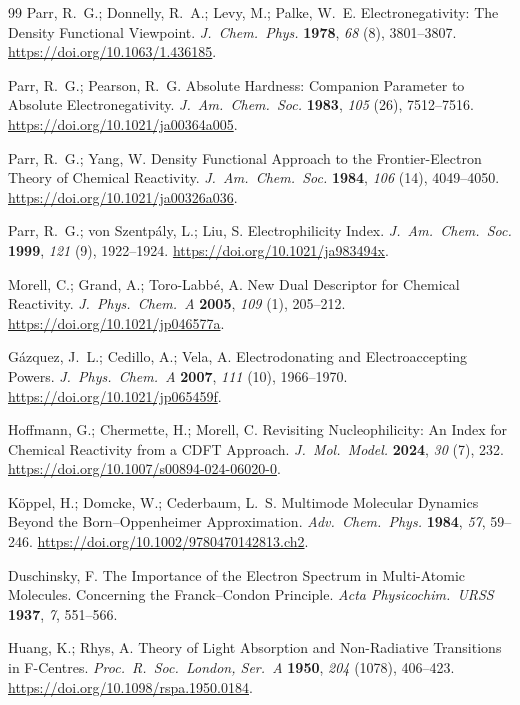 \begin{thebibliography}{99}
Parr, R.~G.; Donnelly, R.~A.; Levy, M.; Palke, W.~E. Electronegativity: The Density Functional Viewpoint. \emph{J.~Chem.~Phys.} \textbf{1978}, \emph{68} (8), 3801--3807. \url{https://doi.org/10.1063/1.436185}.

Parr, R.~G.; Pearson, R.~G. Absolute Hardness: Companion Parameter to Absolute Electronegativity. \emph{J.~Am.~Chem.~Soc.} \textbf{1983}, \emph{105} (26), 7512--7516. \url{https://doi.org/10.1021/ja00364a005}.

Parr, R.~G.; Yang, W. Density Functional Approach to the Frontier-Electron Theory of Chemical Reactivity. \emph{J.~Am.~Chem.~Soc.} \textbf{1984}, \emph{106} (14), 4049--4050. \url{https://doi.org/10.1021/ja00326a036}.

Parr, R.~G.; von Szentpály, L.; Liu, S. Electrophilicity Index. \emph{J.~Am.~Chem.~Soc.} \textbf{1999}, \emph{121} (9), 1922--1924. \url{https://doi.org/10.1021/ja983494x}.

Morell, C.; Grand, A.; Toro-Labbé, A. New Dual Descriptor for Chemical Reactivity. \emph{J.~Phys.~Chem.~A} \textbf{2005}, \emph{109} (1), 205--212. \url{https://doi.org/10.1021/jp046577a}.

Gázquez, J.~L.; Cedillo, A.; Vela, A. Electrodonating and Electroaccepting Powers. \emph{J.~Phys.~Chem.~A} \textbf{2007}, \emph{111} (10), 1966--1970. \url{https://doi.org/10.1021/jp065459f}.

Hoffmann, G.; Chermette, H.; Morell, C. Revisiting Nucleophilicity: An Index for Chemical Reactivity from a CDFT Approach. \emph{J.~Mol.~Model.} \textbf{2024}, \emph{30} (7), 232. \url{https://doi.org/10.1007/s00894-024-06020-0}.

Köppel, H.; Domcke, W.; Cederbaum, L.~S. Multimode Molecular Dynamics Beyond the Born--Oppenheimer Approximation. \emph{Adv.~Chem.~Phys.} \textbf{1984}, \emph{57}, 59--246. \url{https://doi.org/10.1002/9780470142813.ch2}.

Duschinsky, F. The Importance of the Electron Spectrum in Multi-Atomic Molecules. Concerning the Franck--Condon Principle. \emph{Acta Physicochim.~URSS} \textbf{1937}, \emph{7}, 551--566.

Huang, K.; Rhys, A. Theory of Light Absorption and Non-Radiative Transitions in F-Centres. \emph{Proc.~R.~Soc.~London, Ser.~A} \textbf{1950}, \emph{204} (1078), 406--423. \url{https://doi.org/10.1098/rspa.1950.0184}.


\end{thebibliography}
